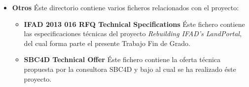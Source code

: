 \begin{itemize}
\begin{itemize}
			\item \textbf{Landportal drupal\footnote{\url{https://github.com/weso/landportal_model}}}  Éste directorio contiene el tema y los módulos de Drupal desarrollados durante éste proyecto.  El diseño de éstos componentes puede consultarse en las secciones \ref{vista_modulos_cms} y \ref{vista_landportal_uris}.
			\item \textbf{Landportal receiver\footnote{\url{https://github.com/weso/landportal-receiver}}}  Éste directorio contiene el Punto de Entrada de Datos del sistema.  El diseño de éste componente fue explicado anteriormente en la sección \ref{vista_receiver}.
		\end{itemize}	
	\item \textbf{Otros}  Éste directorio contiene varios ficheros relacionados con el proyecto:
		\begin{itemize}
			\item \textbf{IFAD 2013 016 RFQ Technical Specifications}  Éste fichero contiene las especificaciones técnicas del proyecto \textit{Rebuilding IFAD's LandPortal}, del cual forma parte el presente Trabajo Fin de Grado.
			\item \textbf{SBC4D Technical Offer}  Éste fichero contiene la oferta técnica propuesta por la consultora SBC4D y bajo al cual se ha realizado éste proyecto.
		\end{itemize}
\end{itemize}
